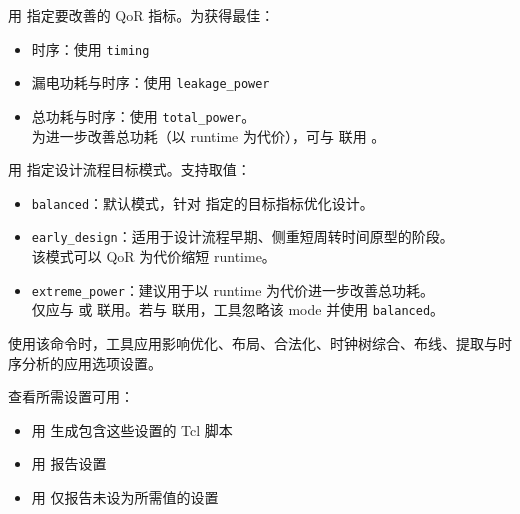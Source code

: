 用  指定要改善的 QoR 指标。为获得最佳：
\begin{itemize}
  \item 时序：使用 \texttt{timing}
  \item 漏电功耗与时序：使用 \texttt{leakage\_power}
  \item 总功耗与时序：使用 \texttt{total\_power}。\\
        为进一步改善总功耗（以 runtime 为代价），可与  联用 。
\end{itemize}

用  指定设计流程目标模式。支持取值：
\begin{itemize}
  \item \texttt{balanced}：默认模式，针对  指定的目标指标优化设计。
  \item \texttt{early\_design}：适用于设计流程早期、侧重短周转时间原型的阶段。\\
        该模式可以 QoR 为代价缩短 runtime。
  \item \texttt{extreme\_power}：建议用于以 runtime 为代价进一步改善总功耗。\\
        仅应与  或  联用。若与  联用，工具忽略该 mode 并使用 \texttt{balanced}。
\end{itemize}

使用该命令时，工具应用影响优化、布局、合法化、时钟树综合、布线、提取与时序分析的应用选项设置。

查看所需设置可用：
\begin{itemize}
  \item 用  生成包含这些设置的 Tcl 脚本
  \item 用  报告设置
  \item 用  仅报告未设为所需值的设置
\end{itemize}

